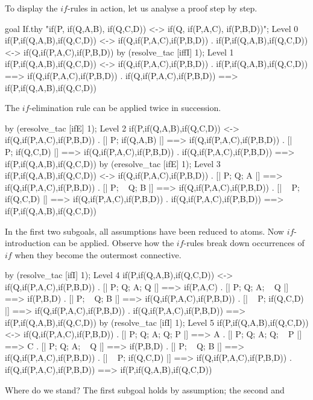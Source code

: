 To display the $if$-rules in action, let us analyse a proof step by step.
\begin{ttbox}
goal If.thy
    "if(P, if(Q,A,B), if(Q,C,D)) <-> if(Q, if(P,A,C), if(P,B,D))";
{\out Level 0}
{\out if(P,if(Q,A,B),if(Q,C,D)) <-> if(Q,if(P,A,C),if(P,B,D))}
{. if(P,if(Q,A,B),if(Q,C,D)) <-> if(Q,if(P,A,C),if(P,B,D))}
\ttbreak
by (resolve_tac [iffI] 1);
{\out Level 1}
{\out if(P,if(Q,A,B),if(Q,C,D)) <-> if(Q,if(P,A,C),if(P,B,D))}
{. if(P,if(Q,A,B),if(Q,C,D)) ==> if(Q,if(P,A,C),if(P,B,D))}
{. if(Q,if(P,A,C),if(P,B,D)) ==> if(P,if(Q,A,B),if(Q,C,D))}
\end{ttbox}
The $if$-elimination rule can be applied twice in succession.
\begin{ttbox}
by (eresolve_tac [ifE] 1);
{\out Level 2}
{\out if(P,if(Q,A,B),if(Q,C,D)) <-> if(Q,if(P,A,C),if(P,B,D))}
{. [| P; if(Q,A,B) |] ==> if(Q,if(P,A,C),if(P,B,D))}
{. [| ~ P; if(Q,C,D) |] ==> if(Q,if(P,A,C),if(P,B,D))}
{. if(Q,if(P,A,C),if(P,B,D)) ==> if(P,if(Q,A,B),if(Q,C,D))}
\ttbreak
by (eresolve_tac [ifE] 1);
{\out Level 3}
{\out if(P,if(Q,A,B),if(Q,C,D)) <-> if(Q,if(P,A,C),if(P,B,D))}
{. [| P; Q; A |] ==> if(Q,if(P,A,C),if(P,B,D))}
{. [| P; ~ Q; B |] ==> if(Q,if(P,A,C),if(P,B,D))}
{. [| ~ P; if(Q,C,D) |] ==> if(Q,if(P,A,C),if(P,B,D))}
{. if(Q,if(P,A,C),if(P,B,D)) ==> if(P,if(Q,A,B),if(Q,C,D))}
\end{ttbox}
%
In the first two subgoals, all assumptions have been reduced to atoms.  Now
$if$-introduction can be applied.  Observe how the $if$-rules break down
occurrences of $if$ when they become the outermost connective.
\begin{ttbox}
by (resolve_tac [ifI] 1);
{\out Level 4}
{\out if(P,if(Q,A,B),if(Q,C,D)) <-> if(Q,if(P,A,C),if(P,B,D))}
{. [| P; Q; A; Q |] ==> if(P,A,C)}
{. [| P; Q; A; ~ Q |] ==> if(P,B,D)}
{. [| P; ~ Q; B |] ==> if(Q,if(P,A,C),if(P,B,D))}
{. [| ~ P; if(Q,C,D) |] ==> if(Q,if(P,A,C),if(P,B,D))}
{. if(Q,if(P,A,C),if(P,B,D)) ==> if(P,if(Q,A,B),if(Q,C,D))}
\ttbreak
by (resolve_tac [ifI] 1);
{\out Level 5}
{\out if(P,if(Q,A,B),if(Q,C,D)) <-> if(Q,if(P,A,C),if(P,B,D))}
{. [| P; Q; A; Q; P |] ==> A}
{. [| P; Q; A; Q; ~ P |] ==> C}
{. [| P; Q; A; ~ Q |] ==> if(P,B,D)}
{. [| P; ~ Q; B |] ==> if(Q,if(P,A,C),if(P,B,D))}
{. [| ~ P; if(Q,C,D) |] ==> if(Q,if(P,A,C),if(P,B,D))}
{. if(Q,if(P,A,C),if(P,B,D)) ==> if(P,if(Q,A,B),if(Q,C,D))}
\end{ttbox}
Where do we stand?  The first subgoal holds by assumption; the second and
